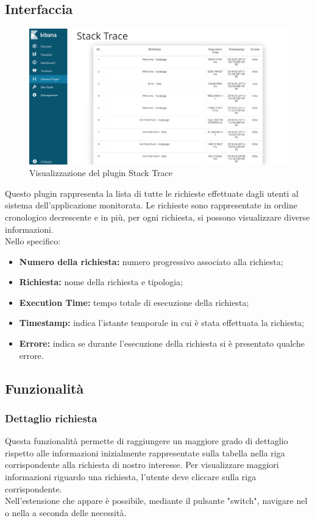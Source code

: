 \subsection{Interfaccia}
\begin{figure}[H]
	\centering 
	\includegraphics[width=1\textwidth]{Images/stack}
	\caption{Visualizzazione del plugin Stack Trace}
\end{figure}
Questo plugin rappresenta la lista di tutte le richieste effettuate dagli utenti al sistema dell'applicazione monitorata. Le richieste sono rappresentate in ordine cronologico decrescente e in più, per ogni richiesta, si possono visualizzare diverse informazioni.\\ Nello specifico:
   
    \begin{itemize}
    	
    	\item \textbf{Numero della richiesta:} numero progressivo associato alla richiesta;
    	\item \textbf{Richiesta:} nome della richiesta e tipologia;
    	\item \textbf{Execution Time:} tempo totale di esecuzione della richiesta;
    	\item \textbf{Timestamp:} indica l'istante temporale in cui è stata effettuata la richiesta;
    	\item \textbf{Errore:} indica se durante l'esecuzione della richiesta si è presentato qualche errore.
    	
    	\end{itemize}

\subsection{Funzionalità}
\subsubsection {Dettaglio richiesta}
Questa funzionalità permette di raggiungere un maggiore grado di dettaglio rispetto alle informazioni inizialmente rappresentate sulla tabella nella riga corrispondente alla richiesta di nostro interesse.
Per visualizzare maggiori informazioni riguardo una richiesta, l'utente deve cliccare sulla riga corrispondente.
\\Nell'estensione che appare è possibile, mediante il pulsante "switch", navigare nel  o nella  a seconda delle necessità.

